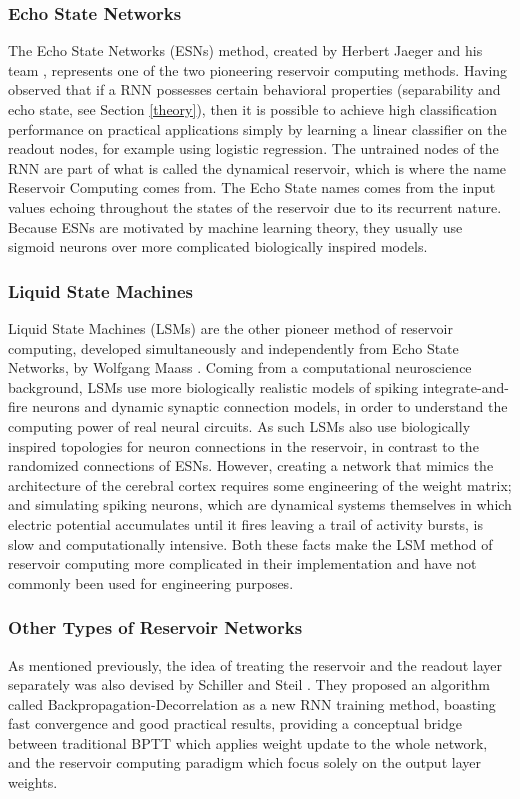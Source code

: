 \documentclass[12pt,oneside]{CUNY_CS_PhD}
\begin{document}
\subsubsection{Echo State Networks}
The Echo State Networks (ESNs) method, created by Herbert Jaeger and his team \cite{jaeger_echo_2001}, represents one of the two pioneering reservoir computing methods. Having observed that if a RNN possesses certain behavioral properties (separability and echo state, see Section \ref{theory}),
 then it is possible to achieve high classification performance on practical applications simply by learning a linear classifier on the readout nodes, for example using logistic regression. The untrained nodes of the RNN are part of what is called the dynamical reservoir, which is where the name Reservoir Computing comes from. The Echo State names comes from the input values echoing throughout the states of the reservoir due to its recurrent nature. Because ESNs are motivated by machine learning theory, they usually use sigmoid neurons over more complicated biologically inspired models.

\subsubsection{Liquid State Machines}
Liquid State Machines (LSMs) are the other pioneer method of reservoir computing, developed simultaneously and independently from Echo State Networks, by Wolfgang Maass \cite{Natschlager2002}. Coming from a computational neuroscience background, LSMs use more biologically realistic models of spiking integrate-and-fire neurons and dynamic synaptic connection models,
 in order to understand the computing power of real neural circuits. As such LSMs also use biologically inspired topologies for neuron connections in the reservoir, in contrast to the randomized connections of ESNs. However, creating a network that mimics the architecture of the cerebral cortex requires some engineering of the weight matrix; and simulating spiking neurons, which are dynamical systems themselves in which electric potential accumulates until it fires leaving a trail of activity bursts, is slow and computationally intensive. Both these facts make the LSM method of reservoir computing more complicated in their implementation  and have not commonly been used for engineering purposes.  

\subsubsection{Other Types of Reservoir Networks}
As mentioned previously, the idea of treating the reservoir and the readout layer separately was also devised by Schiller and Steil \cite{steil2004backpropagation}. They proposed an algorithm called Backpropagation-Decorrelation as a new RNN training method, boasting fast convergence and good practical results, providing a conceptual bridge between traditional BPTT which applies weight update to the whole network, and the reservoir computing paradigm which focus solely on the output layer weights.
\end{document}
